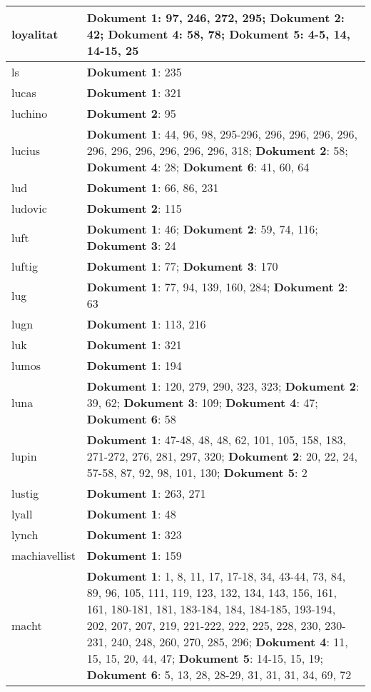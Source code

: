 \documentclass[a5paper]{article}
\begin{document}
\begin{longtable}[l]{|l|p{3in}|}
\hline
loyalitat & \textbf{Dokument 1}: 97, 246, 272, 295; \textbf{Dokument 2}: 42; \textbf{Dokument 4}: 58, 78; \textbf{Dokument 5}: 4-5, 14, 14-15, 25 \\
\hline
ls & \textbf{Dokument 1}: 235 \\
\hline
lucas & \textbf{Dokument 1}: 321 \\
\hline
luchino & \textbf{Dokument 2}: 95 \\
\hline
lucius & \textbf{Dokument 1}: 44, 96, 98, 295-296, 296, 296, 296, 296, 296, 296, 296, 296, 296, 296, 318; \textbf{Dokument 2}: 58; \textbf{Dokument 4}: 28; \textbf{Dokument 6}: 41, 60, 64 \\
\hline
lud & \textbf{Dokument 1}: 66, 86, 231 \\
\hline
ludovic & \textbf{Dokument 2}: 115 \\
\hline
luft & \textbf{Dokument 1}: 46; \textbf{Dokument 2}: 59, 74, 116; \textbf{Dokument 3}: 24 \\
\hline
luftig & \textbf{Dokument 1}: 77; \textbf{Dokument 3}: 170 \\
\hline
lug & \textbf{Dokument 1}: 77, 94, 139, 160, 284; \textbf{Dokument 2}: 63 \\
\hline
lugn & \textbf{Dokument 1}: 113, 216 \\
\hline
luk & \textbf{Dokument 1}: 321 \\
\hline
lumos & \textbf{Dokument 1}: 194 \\
\hline
luna & \textbf{Dokument 1}: 120, 279, 290, 323, 323; \textbf{Dokument 2}: 39, 62; \textbf{Dokument 3}: 109; \textbf{Dokument 4}: 47; \textbf{Dokument 6}: 58 \\
\hline
lupin & \textbf{Dokument 1}: 47-48, 48, 48, 62, 101, 105, 158, 183, 271-272, 276, 281, 297, 320; \textbf{Dokument 2}: 20, 22, 24, 57-58, 87, 92, 98, 101, 130; \textbf{Dokument 5}: 2 \\
\hline
lustig & \textbf{Dokument 1}: 263, 271 \\
\hline
lyall & \textbf{Dokument 1}: 48 \\
\hline
lynch & \textbf{Dokument 1}: 323 \\
\hline
machiavellist & \textbf{Dokument 1}: 159 \\
\hline
macht & \textbf{Dokument 1}: 1, 8, 11, 17, 17-18, 34, 43-44, 73, 84, 89, 96, 105, 111, 119, 123, 132, 134, 143, 156, 161, 161, 180-181, 181, 183-184, 184, 184-185, 193-194, 202, 207, 207, 219, 221-222, 222, 225, 228, 230, 230-231, 240, 248, 260, 270, 285, 296; \textbf{Dokument 4}: 11, 15, 15, 20, 44, 47; \textbf{Dokument 5}: 14-15, 15, 19; \textbf{Dokument 6}: 5, 13, 28, 28-29, 31, 31, 31, 34, 69, 72 \\

\end{longtable}
\end{document}
